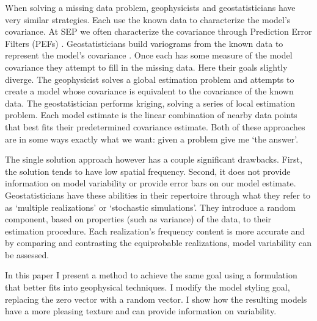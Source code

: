 \par
When solving a missing data problem, geophysicists and geostatisticians have
very similar strategies.
Each use the known data to characterize the model's covariance.  At SEP we
often characterize the covariance through Prediction Error Filters (PEFs)
\cite{gee}.  Geostatisticians build variograms  from the known data
to represent the model's covariance \cite{geostat}.  
Once each has some measure of the model covariance they attempt to fill
in the missing data. Here their goals slightly diverge.
The geophysicist solves a global estimation problem and
attempts to create a model whose 
covariance is equivalent to the covariance of the known data.
The geostatistician performs kriging, solving a series of
local estimation problem. Each model estimate
is the linear combination of nearby data points
that best fits their predetermined covariance estimate.
Both of these approaches are in some ways exactly what we want:
given a problem give me  `the answer'.  
\par
The single solution approach
however has a couple significant drawbacks.  First, the solution tends to 
have low spatial frequency. Second, it does not provide information
on model variability or provide error bars on our model estimate.
Geostatisticians  have these
abilities  in their repertoire through
what they refer to as `multiple realizations' or `stochastic simulations'.
They introduce a random component, based on
properties (such as variance) of the data,   to their estimation procedure.  
Each realization's frequency content is more accurate and by
comparing and contrasting  the equiprobable realizations,
model variability can be assessed.
\par
In this paper I present a method to achieve the same goal
using a formulation that better fits into geophysical techniques.  
I modify the model styling goal,
replacing the zero vector with a random vector.  I show  how
the resulting models have a more pleasing texture and can
provide information on variability.
